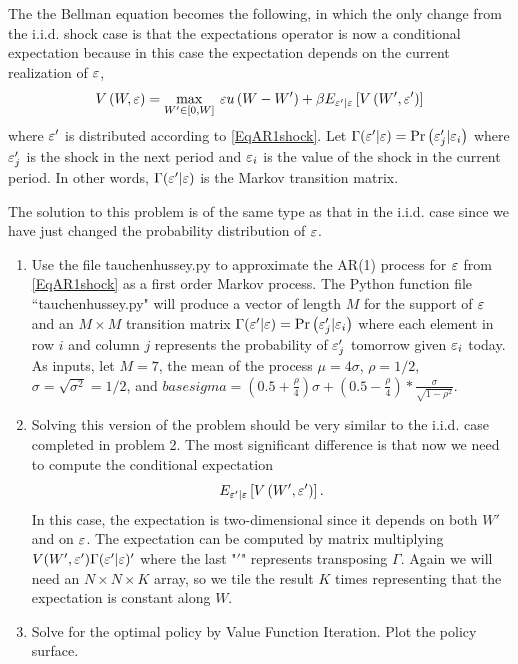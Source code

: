 The the Bellman equation becomes the following, in which the only change from the i.i.d. shock case is that the expectations operator is now a conditional expectation because in this case the expectation depends on the current realization of $\varepsilon$,
\begin{equation*}
   V\left(W,\varepsilon\right) = \max_{W'\in[0,W]}\: \varepsilon u\left(W - W'\right) + \beta E_{\varepsilon'|\varepsilon}\left[V\left(W',\varepsilon'\right)\right]
\end{equation*}
where $\varepsilon'$ is distributed according to \eqref{EqAR1shock}. Let $\Gamma(\varepsilon'|\varepsilon)=\text{Pr}\left(\varepsilon_j'|\varepsilon_i\right)$ where $\varepsilon_j'$ is the shock in the next period and $\varepsilon_i$ is the value of the shock in the current period.  In other words, $\Gamma(\varepsilon' | \varepsilon)$ is the Markov transition matrix.

The solution to this problem is of the same type as that in the i.i.d. case since we have just changed the probability distribution of $\varepsilon$.

\begin{problem}
\begin{enumerate}
   \item Use the file tauchenhussey.py to approximate the AR(1) process for $\varepsilon$ from \eqref{EqAR1shock} as a first order Markov process. The Python function file ``tauchenhussey.py" will produce a vector of length $M$ for the support of $\varepsilon$ and an $M\times M$ transition matrix $\Gamma(\varepsilon'|\varepsilon)=\text{Pr}\left(\varepsilon_j'|\varepsilon_i\right)$ where each element in row $i$ and column $j$ represents the probability of $\varepsilon_j'$ tomorrow given $\varepsilon_i$ today. As inputs, let $M=7$, the mean of the process $\mu=4\sigma$, $\rho = 1/2$, $\sigma=\sqrt{\sigma^2}=1/2$, and $basesigma=(0.5+\frac{\rho}{4})\sigma + (0.5 - \frac{\rho}{4})*\frac{\sigma}{\sqrt{1-\rho^2}}$.

  \item Solving this version of the problem should be very similar to the i.i.d. case completed in problem 2.  The most significant difference is that now we need to compute the conditional expectation
      \begin{equation}
      E_{\varepsilon'|\varepsilon}\left[V\left(W',\varepsilon'\right)\right].
      \end{equation}
      In this case, the expectation is two-dimensional since it depends on both $W'$ and on $\varepsilon$.  The expectation can be computed by matrix multiplying $V(W',\varepsilon')\Gamma(\varepsilon' | \varepsilon)'$ where the last "$'$" represents transposing $\Gamma$.  Again we will need an $N\times N\times K$ array, so we tile the result $K$ times representing that the expectation is constant along $W$.
      
  \item Solve for the optimal policy by Value Function Iteration.  Plot the policy surface.
      
  
\end{enumerate} 
\end{problem}